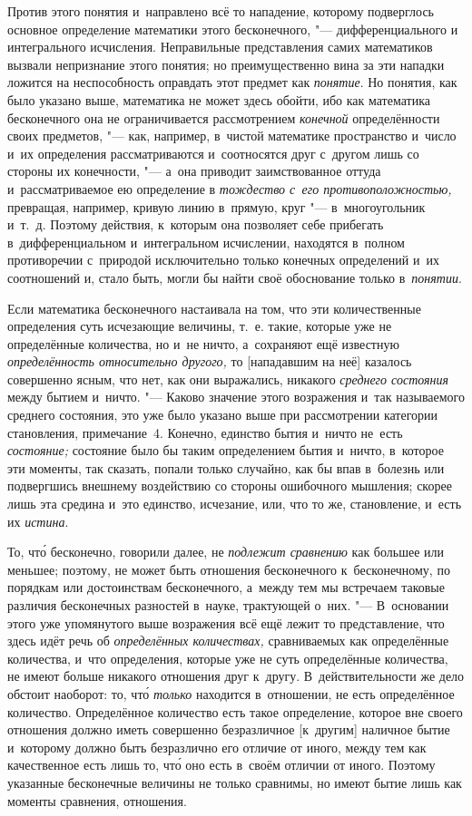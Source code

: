 Против этого понятия и~направлено всё то нападение, которому подверглось
основное определение математики этого бесконечного, "--- дифференциального и
интегрального исчисления. Неправильные представления самих математиков вызвали
непризнание этого понятия; но преимущественно вина за эти нападки ложится на
неспособность оправдать этот предмет как {\em понятие}. Но понятия, как было
указано выше, математика не может здесь обойти, ибо как математика бесконечного
она не ограничивается рассмотрением {\em конечной} определённости своих
предметов, "--- как, например, в~чистой математике пространство и~число и~их
определения рассматриваются и~соотносятся друг с~другом лишь со стороны их
конечности, "--- а~она приводит заимствованное оттуда и~рассматриваемое ею
определение в {\em тождество с~его противоположностью,} превращая, например,
кривую линию в~прямую, круг "--- в~многоугольник и~т.~д. Поэтому действия, к~которым
она позволяет себе прибегать в~дифференциальном и~интегральном исчислении,
находятся в~полном противоречии с~природой исключительно только конечных
определений и~их соотношений и, стало быть, могли бы найти своё обоснование
только в~{\em понятии}.

Если математика бесконечного настаивала на том, что эти количественные
определения суть исчезающие величины, т.~е. такие, которые уже
не определённые количества, но и~не ничто, а~сохраняют ещё
известную {\em определённость относительно другого,} то
[нападавшим на неё] казалось совершенно ясным, что нет,
как они выражались, никакого {\em среднего состояния} между
бытием и~ничто. "--- Каково значение этого возражения
и~так называемого среднего состояния, это уже было указано
выше при рассмотрении категории становления, примечание~4. Конечно,
единство бытия и~ничто не~есть {\em состояние;} состояние было бы
таким определением бытия и~ничто, в~которое эти моменты, так сказать, попали
только случайно, как бы впав в~болезнь или подвергшись внешнему воздействию
со стороны ошибочного мышления; скорее лишь эта средина и~это единство,
исчезание, или, что то же, становление, и~есть их {\em истина}.

То, чт\'{о} бесконечно, говорили далее, не {\em подлежит сравнению} как большее или
меньшее; поэтому, не может быть отношения бесконечного к~бесконечному, по
порядкам или достоинствам бесконечного, а~между тем мы встречаем таковые
различия бесконечных разностей в~науке, трактующей о~них. "--- В~основании
этого уже упомянутого выше возражения всё ещё лежит то представление, что здесь
идёт речь об {\em определённых количествах,} сравниваемых как определённые
количества, и~что определения, которые уже не суть определённые количества, не
имеют больше никакого отношения друг к~другу. В~действительности же дело
обстоит наоборот: то, чт\'{о} {\em только} находится в~отношении, не есть
определённое количество. Определённое количество есть такое определение,
которое вне своего отношения должно иметь совершенно безразличное [к~другим]
наличное бытие и~которому должно быть безразлично его отличие от
иного, между тем как качественное есть лишь то, чт\'{о} оно
есть в~своём отличии от иного. Поэтому указанные бесконечные величины не
только сравнимы, но имеют бытие лишь как моменты сравнения, отношения.

